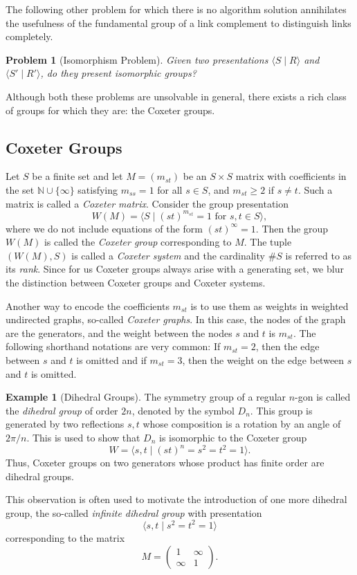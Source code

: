 \documentclass[a4paper]{article}
\newtheorem{problem}[theorem]{Problem}
\theoremstyle{definition}
\newtheorem{example}[theorem]{Example}
\begin{document}
The following other problem for which there is no algorithm solution annihilates the usefulness of the fundamental group of a link complement to distinguish links completely.

\begin{problem}[Isomorphism Problem]
Given two presentations $\langle S \; | \; R \rangle $ and $ \langle S' \; | \; R' \rangle$, do they present isomorphic groups?
\end{problem}

Although both these problems are unsolvable in general, there exists a rich class of groups for which they are: the Coxeter groups.

\subsection{Coxeter Groups}\label{sub:coxeter_groups}
Let $S$ be a finite set and let $M = (m_{st})$ be an $S \times S$ matrix with coefficients in the set $\mathbb{N} \cup \{\infty\}$ satisfying $m_{ss} = 1$ for all $s \in S$, and $m_{st} \geq 2$ if $s \ne t$. Such a matrix is called a \textit{Coxeter matrix}. Consider the group presentation
$$W(M) = \langle S \; | \; (st)^{m_{st}} = 1 \text{ for } s,t\in S \rangle,$$
where we do not include equations of the form $(st)^\infty = 1$.
Then the group $W(M)$ is called the \textit{Coxeter group} corresponding to $M$. The tuple $(W(M),S)$ is called a \textit{Coxeter system} and the cardinality $\#S$ is referred to as its \textit{rank}. Since for us Coxeter groups always arise with a generating set, we blur the distinction between Coxeter groups and Coxeter systems.

Another way to encode the coefficients $m_{st}$ is to use them as weights in weighted undirected graphs, so-called \textit{Coxeter graphs}. In this case, the nodes of the graph are the generators, and the weight between the nodes $s$ and $t$ is $m_{st}$. The following shorthand notations are very common: If $m_{st} = 2$, then the edge between $s$ and $t$ is omitted and if $m_{st} = 3$, then the weight on the edge between $s$ and $t$ is omitted.

\begin{example}[Dihedral Groups]
The symmetry group of a regular $n$-gon is called the \textit{dihedral group} of order $2n$, denoted by the symbol $D_n$. This group is generated by two reflections $s, t$ whose composition is a rotation by an angle of~$2\pi/n$. This is used to show that $D_n$ is isomorphic to the Coxeter group
$$W = \langle s, t \; | \; (st)^n = s^2 = t^2 = 1 \rangle.$$
Thus, Coxeter groups on two generators whose product has finite order are dihedral groups.

This observation is often used to motivate the introduction of one more dihedral group, the so-called \textit{infinite dihedral group} with presentation
$$\langle s, t \; | \; s^2 = t^2 = 1 \rangle$$
corresponding to the matrix
$$M = \left(\begin{matrix}
1 & \infty \\
\infty & 1
\end{matrix}\right).$$
\end{example}
\end{document}
